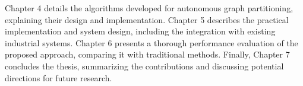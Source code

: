 Chapter 4 details the algorithms developed for autonomous graph partitioning, explaining their design and implementation. Chapter 5 describes the practical implementation and system design, including the integration with existing industrial systems. Chapter 6 presents a thorough performance evaluation of the proposed approach, comparing it with traditional methods. Finally, Chapter 7 concludes the thesis, summarizing the contributions and discussing potential directions for future research. 